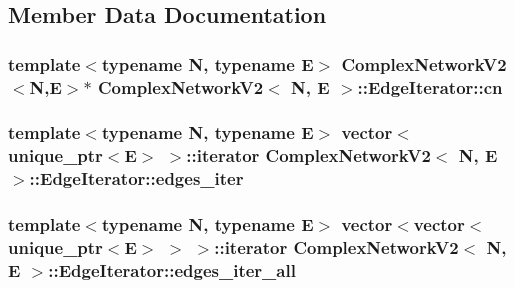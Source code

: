 \subsection{Member Data Documentation}
\hypertarget{class_complex_network_v2_1_1_edge_iterator_a709735909d7520bbca232fa1ca059b8e}{
\subsubsection[{cn}]{\setlength{\rightskip}{0pt plus 5cm}template$<$typename N, typename E$>$ {\bf Complex\+Network\+V2}$<$N,E$>$$\ast$ {\bf Complex\+Network\+V2}$<$ N, E $>$\+::Edge\+Iterator\+::cn\hspace{0.3cm}{\ttfamily [private]}}}\label{class_complex_network_v2_1_1_edge_iterator_a709735909d7520bbca232fa1ca059b8e}
\hypertarget{class_complex_network_v2_1_1_edge_iterator_a5188ace1babf02c9839d5e277e1d2842}{
\subsubsection[{edges\+\_\+iter}]{\setlength{\rightskip}{0pt plus 5cm}template$<$typename N, typename E$>$ vector$<$ unique\+\_\+ptr$<$E$>$ $>$\+::iterator {\bf Complex\+Network\+V2}$<$ N, E $>$\+::Edge\+Iterator\+::edges\+\_\+iter\hspace{0.3cm}{\ttfamily [private]}}}\label{class_complex_network_v2_1_1_edge_iterator_a5188ace1babf02c9839d5e277e1d2842}
\hypertarget{class_complex_network_v2_1_1_edge_iterator_a9e36b31624697cb24ff09aac7b56570a}{
\subsubsection[{edges\+\_\+iter\+\_\+all}]{\setlength{\rightskip}{0pt plus 5cm}template$<$typename N, typename E$>$ vector$<$vector$<$ unique\+\_\+ptr$<$E$>$ $>$ $>$\+::iterator {\bf Complex\+Network\+V2}$<$ N, E $>$\+::Edge\+Iterator\+::edges\+\_\+iter\+\_\+all\hspace{0.3cm}{\ttfamily [private]}}}\label{class_complex_network_v2_1_1_edge_iterator_a9e36b31624697cb24ff09aac7b56570a}
